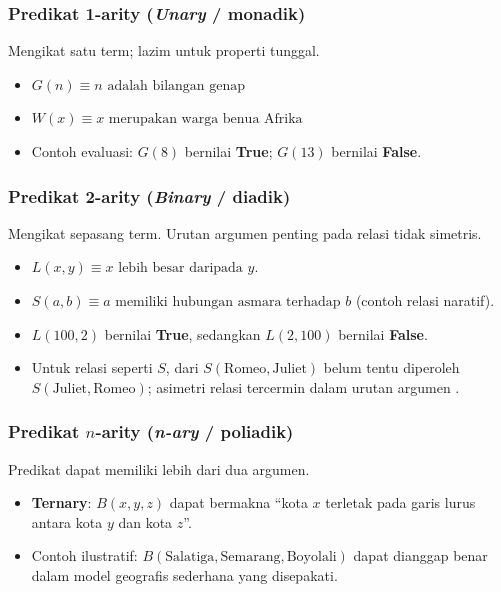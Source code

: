 \subsubsection{Predikat 1-arity (\textit{Unary} / monadik)}
Mengikat satu term; lazim untuk properti tunggal.
\begin{itemize}
    \item $G(n) \equiv n \text{ adalah bilangan genap}$
    \item $W(x) \equiv x \text{ merupakan warga benua Afrika}$
    \item Contoh evaluasi: $G(8)$ bernilai \textbf{True}; $G(13)$ bernilai \textbf{False}.
\end{itemize}

\subsubsection{Predikat 2-arity (\textit{Binary} / diadik)}
Mengikat sepasang term. Urutan argumen penting pada relasi tidak simetris.
\begin{itemize}
    \item $L(x, y) \equiv x \text{ lebih besar daripada } y$.
    \item $S(a, b) \equiv a \text{ memiliki hubungan asmara terhadap } b$ (contoh relasi naratif).
    \item $L(100, 2)$ bernilai \textbf{True}, sedangkan $L(2, 100)$ bernilai \textbf{False}.
    \item Untuk relasi seperti $S$, dari $S(\text{Romeo}, \text{Juliet})$ belum tentu diperoleh $S(\text{Juliet}, \text{Romeo})$; asimetri relasi tercermin dalam urutan argumen \cite{wiki_first_order_logic}.
\end{itemize}

\subsubsection{Predikat $n$-arity (\textit{n-ary} / poliadik)}
Predikat dapat memiliki lebih dari dua argumen.
\begin{itemize}
    \item \textbf{Ternary}: $B(x, y, z)$ dapat bermakna ``kota $x$ terletak pada garis lurus antara kota $y$ dan kota $z$''.
    \item Contoh ilustratif: $B(\text{Salatiga}, \text{Semarang}, \text{Boyolali})$ dapat dianggap benar dalam model geografis sederhana yang disepakati.
\end{itemize}

